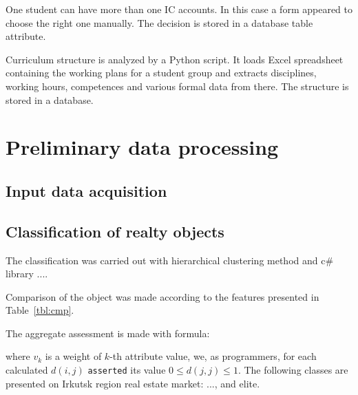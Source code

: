 \documentclass[conference]{IEEEtran}
\begin{document}

One student can have more than one IC accounts.  In this case a form appeared to choose the right one manually.  The decision is stored in a database table attribute.

Curriculum structure is analyzed by a Python script.  It loads Excel spreadsheet containing the working plans for a student group and extracts disciplines, working hours, competences and various formal data from there.  The structure is stored in a database.

\section{Preliminary data processing}
\label{sec:relim-proc}


\subsection{Input data acquisition}
\label{sec:tech-input}


\subsection{Classification of realty objects}
\label{sec:class-realty}

The classification was carried out with hierarchical clustering method and c\# library ....

Comparison of the object was made according to the features presented in Table~\ref{tbl:cmp}.
\begin{table}[th]
  \caption{Comparing features and their weight coefficients}
  \label{tab:cmp}
  \centering
\end{table}

The aggregate assessment is made with formula:

where $v_k$ is a weight of $k$-th attribute value, we, as programmers, for each calculated $d(i,j)$ \texttt{asserted} its value $0\leqslant d(j,j)\leqslant 1$.
The following classes are presented on Irkutsk region real estate market: ..., and elite.
\end{document}

